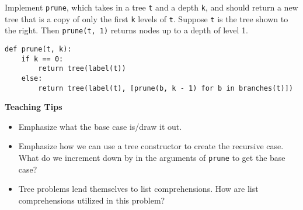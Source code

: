 \begin{blocksection}
\question Implement \lstinline$prune$, which takes in a tree \lstinline$t$ and a depth
\lstinline$k$, and should return a new tree that is a copy of only the first \lstinline$k$
levels of \lstinline$t$. Suppose \lstinline$t$ is the tree shown to the right. Then
\lstinline$prune(t, 1)$ returns nodes up to a depth of level 1.

\begin{solution}[1in]
\begin{lstlisting}
def prune(t, k):
    if k == 0:
        return tree(label(t))
    else:
        return tree(label(t), [prune(b, k - 1) for b in branches(t)])
\end{lstlisting}
\end{solution}
\end{blocksection}

\begin{guide}
    \begin{blocksection}
    \textbf{Teaching Tips}
    \begin{itemize}
        \item Emphasize what the base case is/draw it out.
        \item Emphasize how we can use a tree constructor to create the recursive case. What do we increment down by in the arguments of \lstinline$prune$ to get the base case?
        \item Tree problems lend themselves to list comprehensions. How are list comprehensions utilized in this problem?
    \end{itemize}
    \end{blocksection}
\end{guide}